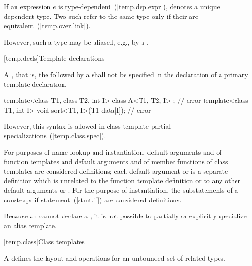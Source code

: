 \pnum
If an expression $e$ is type-dependent~(\ref{temp.dep.expr}),
denotes a unique dependent type. Two such 
refer to the same type only if their  are
equivalent~(\ref{temp.over.link}).
\begin{note} However, such a type may be aliased,
e.g., by a . \end{note}

[temp.decls]{Template declarations}

\pnum
A
,
that is, the
followed by a
shall not be specified in the declaration of a primary template declaration.
\begin{example}

\begin{codeblock}
template<class T1, class T2, int I> class A<T1, T2, I> { };     // error
template<class T1, int I> void sort<T1, I>(T1 data[I]);         // error
\end{codeblock}
\end{example}
\begin{note}
However, this syntax is allowed in class template partial specializations~(\ref{temp.class.spec}).
\end{note}

\pnum
For purposes of name lookup and instantiation,
default arguments and  of function
templates and default arguments and  of
member functions of class templates are considered definitions;
each default argument or  is a separate
definition which is unrelated to
the function template definition or to any other default arguments or
.
For the purpose of instantiation, the substatements of a constexpr if
statement~(\ref{stmt.if}) are considered definitions.

\pnum
Because an  cannot declare a
, it is not possible to partially or
explicitly specialize an alias template.

[temp.class]{Class templates}

\pnum
A
defines the layout and operations
for an unbounded set of related types.

